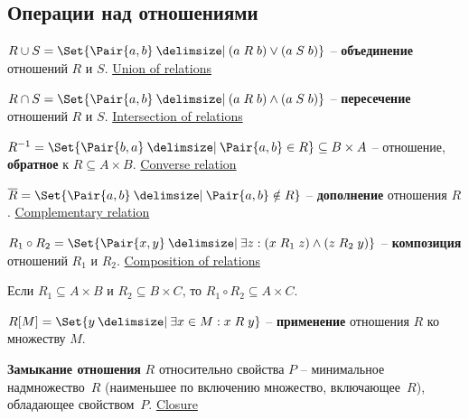\documentclass[a4paper,10pt]{article}
\begin{document}
\subsection{Операции над отношениями}

\begin{terms}
    \item $R \union S = \Set{\Pair{a,b} \given (a \rel[R] b) \lor (a \rel[S] b)}$ \--- \textbf{объединение} отношений $R$ и $S$.
    \hfill\href{https://en.wikipedia.org/wiki/Binary_relation#Union}{Union of relations}

    \item $R \intersection S = \Set{\Pair{a,b} \given (a \rel[R] b) \land (a \rel[S] b)}$ \--- \textbf{пересечение} отношений $R$ и $S$.
    \hfill\href{https://en.wikipedia.org/wiki/Binary_relation#Intersection}{Intersection of relations}

    \item $R^{-1} = \Set{\Pair{b,a} \given \Pair{a,b} \in R} \subseteq B \times A$ \--- отношение, \textbf{обратное} к $R \subseteq A \times B$.
    \hfill\href{https://en.wikipedia.org/wiki/Converse_relation}{Converse relation}

    \item $\overline{R} = \Set{\Pair{a,b} \given \Pair{a,b} \notin R}$ \--- \textbf{дополнение} отношения $R$.
    \hfill\href{https://en.wikipedia.org/wiki/Complement_(set_theory)\#Complementary_relation}{Complementary relation}

    \item $R_1 \circ R_2 = \Set{\Pair{x,y} \given \exists z : (x \rel[R_1] z) \land (z \rel[R_2] y)}$ \--- \textbf{композиция} отношений $R_1$ и $R_2$.
    \hfill\href{https://en.wikipedia.org/wiki/Composition_of_relations}{Composition of relations}
    \begin{terms}
        \item Если $R_1 \subseteq A \times B$ и $R_2 \subseteq B \times C$, то $R_1 \circ R_2 \subseteq A \times C$.
    \end{terms}

    \item $R[M] = \Set{y \given \exists x \in M : x \rel y}$ \--- \textbf{применение} отношения $R$ ко множеству $M$.

    \item \textbf{Замыкание отношения} $R$ относительно свойства $P$ \--- минимальное надмножество~$R$ (наименьшее по включению множество, включающее~$R$), обладающее свойством~$P$.
    \hfill\href{https://en.wikipedia.org/wiki/Closure_(mathematics)#Binary_relation_closures}{Closure}


\end{terms}
\end{document}

